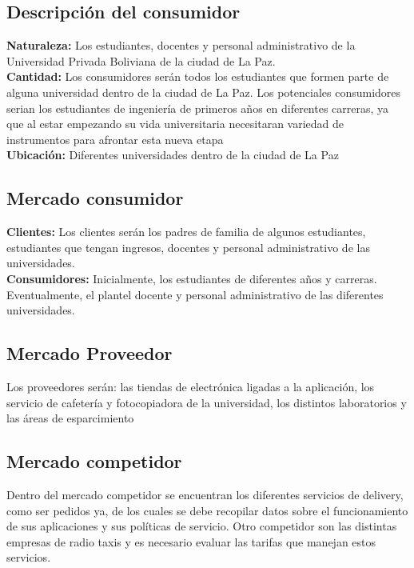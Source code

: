 \documentclass[11pt]{article}
\begin{document}
    \subsection{Descripción del consumidor} 
    
    \textbf{Naturaleza:} Los estudiantes, docentes y personal administrativo de la Universidad Privada Boliviana de la ciudad de La Paz.\\
    
    \textbf{Cantidad:} Los consumidores serán todos los estudiantes que 
formen parte de alguna universidad dentro de la ciudad
de La Paz. Los potenciales consumidores serian los estudiantes
de ingeniería de primeros años en diferentes carreras, 
ya que al estar empezando su vida universitaria necesitaran variedad de instrumentos para
afrontar esta nueva etapa\\
    
    \textbf{Ubicación:} Diferentes universidades dentro de la ciudad de La
Paz

    
    \subsection{Mercado consumidor} 
    
    \textbf{Clientes:} Los clientes serán los padres de familia de algunos estudiantes, estudiantes que tengan ingresos, docentes y personal administrativo de las universidades.\\
    
    \textbf{Consumidores:} Inicialmente, los estudiantes de diferentes años y carreras. Eventualmente, el plantel docente y personal administrativo de las diferentes universidades.
    
    \subsection{Mercado Proveedor} 
    
    Los proveedores serán: las tiendas de electrónica ligadas a la aplicación, los servicio de cafetería y fotocopiadora de la universidad, los distintos laboratorios y las áreas de esparcimiento
    
    \subsection{Mercado competidor} 
    
    Dentro del mercado competidor se encuentran los diferentes servicios de delivery, como ser pedidos ya, de los cuales se debe recopilar datos sobre el funcionamiento de sus aplicaciones y sus políticas de servicio. Otro competidor son las distintas empresas de radio taxis y es necesario evaluar las tarifas que manejan estos servicios.
    
\end{document}
